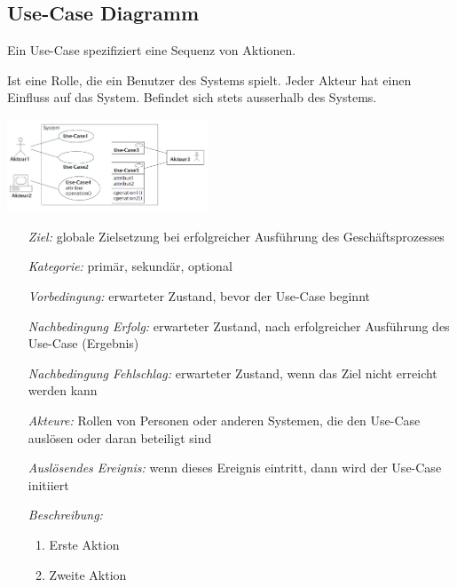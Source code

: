 \subsection{Use-Case Diagramm }
	Ein Use-Case spezifiziert eine Sequenz von Aktionen.
	\begin{description}[leftmargin=2.5cm]
		\item[Akteur]
      \parbox{7cm}{
        Ist eine Rolle, die ein Benutzer des Systems spielt. Jeder Akteur hat einen Einfluss auf das System. Befindet sich stets ausserhalb des Systems.}
      \hspace{0.5cm}
      \parbox{6cm}{\includegraphics[width=6cm]{./images/UseCase_Notation.png}}
    \item[Schablone \Balzert{68}]
      \begin{itemize}[leftmargin=4.5cm]
        \item[\textit{Ziel:}]
          globale Zielsetzung bei erfolgreicher Ausführung des Geschäftsprozesses
        \item[\textit{Kategorie:}]
          primär, sekundär, optional
        \item[\textit{Vorbedingung:}]
          erwarteter Zustand, bevor der Use-Case beginnt
        \item[\textit{Nachbedingung Erfolg:}]
          erwarteter Zustand, nach erfolgreicher Ausführung des Use-Case (Ergebnis)
        \item[\textit{Nachbedingung Fehlschlag:}]
          erwarteter Zustand, wenn das Ziel nicht erreicht werden kann
        \item[\textit{Akteure:}]
          Rollen von Personen oder anderen Systemen, die den Use-Case auslösen
          oder daran beteiligt sind
        \item[\textit{Auslösendes Ereignis:}]
          wenn dieses Ereignis eintritt, dann wird der Use-Case initiiert
        \item[\textit{Beschreibung:}]
          \begin{enumerate}[leftmargin=0.5cm]
            \item Erste Aktion
            \item Zweite Aktion
          \end{enumerate}

\end{itemize}
\end{description}
